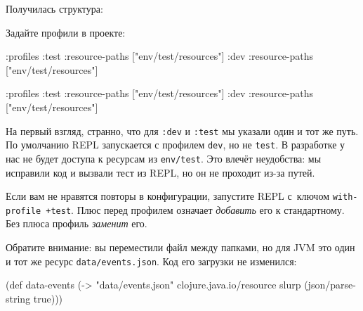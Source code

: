 \fi

\noindent
Получилась структура:

\begin{english}
\end{english}


\linegap

\noindent
Задайте профили в проекте:

\ifx\DEVICETYPE\MOBILE

\begin{english}
  \begin{clojure}
:profiles {:test {:resource-paths
                  ["env/test/resources"]}
           :dev {:resource-paths
                 ["env/test/resources"]}}
  \end{clojure}
\end{english}

\else

\begin{english}
  \begin{clojure}
:profiles {:test {:resource-paths ["env/test/resources"]}
           :dev  {:resource-paths ["env/test/resources"]}}
  \end{clojure}
\end{english}

\fi

На первый взгляд, странно, что для \verb|:dev| и \verb|:test| мы указали один
и тот же путь. По умолчанию REPL запускается с профилем \verb|dev|, но не
\verb|test|. В разработке у нас не будет доступа к ресурсам из
\verb|env/test|. Это влечёт неудобства: мы исправили код и вызвали тест из
REPL, но он не проходит из-за путей.


\mnoindent
Если вам не нравятся повторы в конфигурации, запустите REPL с~ключом
\verb|with-profile +test|. Плюс перед профилем означает \emph{добавить} его к
стандартному. Без плюса профиль \emph{заменит} его.


Обратите внимание: вы переместили файл между папками, но для JVM это один и тот
же ресурс \verb|data/events.json|. Код его загрузки не изменился:

\begin{english}
  \begin{clojure}
(def data-events
  (-> "data/events.json"
      clojure.java.io/resource
      slurp
      (json/parse-string true)))
  \end{clojure}
\end{english}


